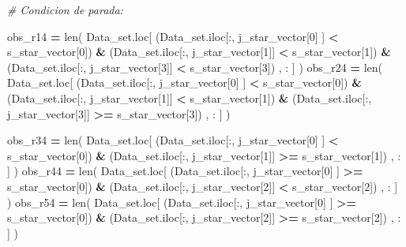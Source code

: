 \documentclass[
  11pt,
  a4paper,
]{article}
\newenvironment{Shaded}{\begin{snugshade}}{\end{snugshade}}
\newcommand{\BuiltInTok}[1]{#1}
\newcommand{\CommentTok}[1]{\textcolor[rgb]{0.56,0.35,0.01}{\textit{#1}}}
\newcommand{\DecValTok}[1]{\textcolor[rgb]{0.00,0.00,0.81}{#1}}
\newcommand{\NormalTok}[1]{#1}
\newcommand{\OperatorTok}[1]{\textcolor[rgb]{0.81,0.36,0.00}{\textbf{#1}}}
\begin{document}
\begin{Shaded}
\begin{Highlighting}[]
        \CommentTok{\# Condicion de parada:}

\NormalTok{        obs\_r14 }\OperatorTok{=} \BuiltInTok{len}\NormalTok{( Data\_set.loc[ (Data\_set.iloc[:, j\_star\_vector[}\DecValTok{0}\NormalTok{] ] }\OperatorTok{\textless{}}\NormalTok{ s\_star\_vector[}\DecValTok{0}\NormalTok{]) }\OperatorTok{\&}\NormalTok{ (Data\_set.iloc[:, j\_star\_vector[}\DecValTok{1}\NormalTok{]] }\OperatorTok{\textless{}}\NormalTok{ s\_star\_vector[}\DecValTok{1}\NormalTok{]) }\OperatorTok{\&}\NormalTok{ (Data\_set.iloc[:, j\_star\_vector[}\DecValTok{3}\NormalTok{]] }\OperatorTok{\textless{}}\NormalTok{ s\_star\_vector[}\DecValTok{3}\NormalTok{]) , : ] )}
\NormalTok{        obs\_r24 }\OperatorTok{=} \BuiltInTok{len}\NormalTok{( Data\_set.loc[ (Data\_set.iloc[:, j\_star\_vector[}\DecValTok{0}\NormalTok{] ] }\OperatorTok{\textless{}}\NormalTok{ s\_star\_vector[}\DecValTok{0}\NormalTok{]) }\OperatorTok{\&}\NormalTok{ (Data\_set.iloc[:, j\_star\_vector[}\DecValTok{1}\NormalTok{]] }\OperatorTok{\textless{}}\NormalTok{ s\_star\_vector[}\DecValTok{1}\NormalTok{]) }\OperatorTok{\&}\NormalTok{ (Data\_set.iloc[:, j\_star\_vector[}\DecValTok{3}\NormalTok{]] }\OperatorTok{\textgreater{}=}\NormalTok{ s\_star\_vector[}\DecValTok{3}\NormalTok{]) , : ] )}

\NormalTok{        obs\_r34 }\OperatorTok{=} \BuiltInTok{len}\NormalTok{( Data\_set.loc[ (Data\_set.iloc[:, j\_star\_vector[}\DecValTok{0}\NormalTok{] ] }\OperatorTok{\textless{}}\NormalTok{ s\_star\_vector[}\DecValTok{0}\NormalTok{]) }\OperatorTok{\&}\NormalTok{ (Data\_set.iloc[:, j\_star\_vector[}\DecValTok{1}\NormalTok{]] }\OperatorTok{\textgreater{}=}\NormalTok{ s\_star\_vector[}\DecValTok{1}\NormalTok{]) , : ] )}
\NormalTok{        obs\_r44 }\OperatorTok{=} \BuiltInTok{len}\NormalTok{( Data\_set.loc[ (Data\_set.iloc[:, j\_star\_vector[}\DecValTok{0}\NormalTok{] ] }\OperatorTok{\textgreater{}=}\NormalTok{ s\_star\_vector[}\DecValTok{0}\NormalTok{]) }\OperatorTok{\&}\NormalTok{ (Data\_set.iloc[:, j\_star\_vector[}\DecValTok{2}\NormalTok{]] }\OperatorTok{\textless{}}\NormalTok{ s\_star\_vector[}\DecValTok{2}\NormalTok{]) , : ] )}
\NormalTok{        obs\_r54 }\OperatorTok{=} \BuiltInTok{len}\NormalTok{( Data\_set.loc[ (Data\_set.iloc[:, j\_star\_vector[}\DecValTok{0}\NormalTok{] ] }\OperatorTok{\textgreater{}=}\NormalTok{ s\_star\_vector[}\DecValTok{0}\NormalTok{]) }\OperatorTok{\&}\NormalTok{ (Data\_set.iloc[:, j\_star\_vector[}\DecValTok{2}\NormalTok{]] }\OperatorTok{\textgreater{}=}\NormalTok{ s\_star\_vector[}\DecValTok{2}\NormalTok{]) , : ] )}



\end{Highlighting}
\end{Shaded}
\end{document}
